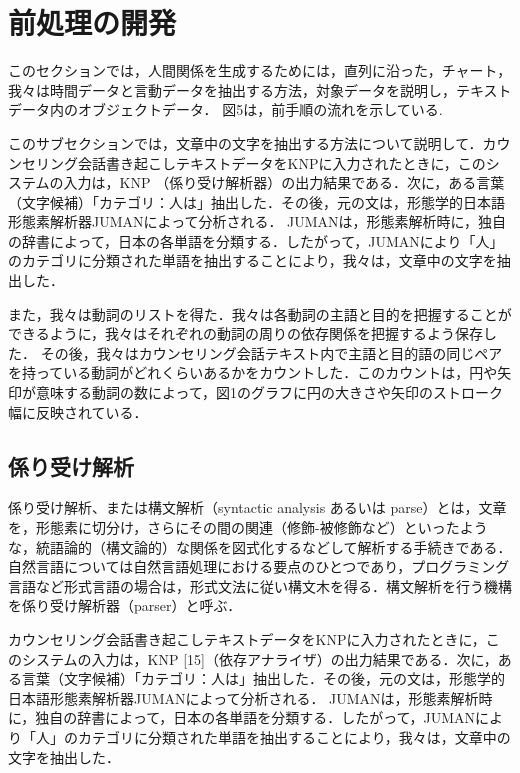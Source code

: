 \documentclass[shuuron]{kuee}
\begin{document}
\section{前処理の開発}

  このセクションでは，人間関係を生成するためには，直列に沿った，チャート，我々は時間データと言動データを抽出する方法，対象データを説明し，テキストデータ内のオブジェクトデータ． 図5は，前手順の流れを示している.

  このサブセクションでは，文章中の文字を抽出する方法について説明して．カウンセリング会話書き起こしテキストデータをKNPに入力されたときに，このシステムの入力は，KNP \cite{KNP}（係り受け解析器）の出力結果である．次に，ある言葉（文字候補）「カテゴリ：人は」抽出した．その後，元の文は，形態学的日本語形態素解析器JUMAN\cite{juman}によって分析される． JUMANは，形態素解析時に，独自の辞書によって，日本の各単語を分類する．したがって，JUMANにより「人」のカテゴリに分類された単語を抽出することにより，我々は，文章中の文字を抽出した．

  また，我々は動詞のリストを得た．我々は各動詞の主語と目的を把握することができるように，我々はそれぞれの動詞の周りの依存関係を把握するよう保存した．
  その後，我々はカウンセリング会話テキスト内で主語と目的語の同じペアを持っている動詞がどれくらいあるかをカウントした．このカウントは，円や矢印が意味する動詞の数によって，図1のグラフに円の大きさや矢印のストローク幅に反映されている．


  \subsection{係り受け解析}


係り受け解析、または構文解析（syntactic analysis あるいは parse）とは，文章を，形態素に切分け，さらにその間の関連（修飾-被修飾など）といったような，統語論的（構文論的）な関係を図式化するなどして解析する手続きである．自然言語については自然言語処理における要点のひとつであり，プログラミング言語など形式言語の場合は，形式文法に従い構文木を得る．構文解析を行う機構を係り受け解析器（parser）と呼ぶ．

カウンセリング会話書き起こしテキストデータをKNPに入力されたときに，このシステムの入力は，KNP [15]（依存アナライザ）の出力結果である．次に，ある言葉（文字候補）「カテゴリ：人は」抽出した．その後，元の文は，形態学的日本語形態素解析器JUMAN\cite{juman}によって分析される． JUMANは，形態素解析時に，独自の辞書によって，日本の各単語を分類する．したがって，JUMANにより「人」のカテゴリに分類された単語を抽出することにより，我々は，文章中の文字を抽出した．
\end{document}
